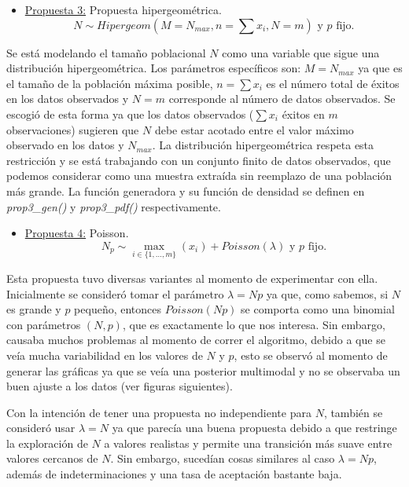 \begin{itemize}
	\item \underline{Propuesta 3:} Propuesta hipergeométrica.
	\begin{equation} \label{eq:12}
		N \sim Hipergeom(M = N_{max}, n = \sum x_{i}, N = m) \text{ y } p \text{ fijo.}
	\end{equation}
\end{itemize}
Se está modelando el tamaño poblacional $N$ como una variable que sigue una distribución hipergeométrica. Los parámetros específicos son: $M = N_{max}$ ya que es el tamaño de la población máxima posible, $n = \sum x_{i}$ es el número total de éxitos en los datos observados y $N = m$ corresponde al número de datos observados. Se escogió de esta forma ya que los datos observados ($\sum x_i$  éxitos en $m$ observaciones) sugieren que $N$ debe estar acotado entre el valor máximo observado en los datos y $N_{max}$. La distribución hipergeométrica respeta esta restricción y se está trabajando con un conjunto finito de datos observados, que podemos considerar como una muestra extraída sin reemplazo de una población más grande. La función generadora y su función de densidad se definen en \textit{prop3\_gen()} y \textit{prop3\_pdf()} respectivamente.

\begin{itemize}
	\item \underline{Propuesta 4:} Poisson.
	\begin{equation} \label{eq:13}
		N_{p} \sim \max _{i \in\{1, \ldots, m\}}\left(x_{i}\right)+ Poisson(\lambda) \text{ y } p \text{ fijo.}
	\end{equation}
\end{itemize}
Esta propuesta tuvo diversas variantes al momento de experimentar con ella. Inicialmente se consideró tomar el parámetro $\lambda=Np$ ya que, como sabemos, si $N$ es grande y $p$ pequeño, entonces $Poisson(Np)$ se comporta como una binomial con parámetros $(N,p)$, que es exactamente lo que nos interesa. Sin embargo, causaba muchos problemas al momento de correr el algoritmo, debido a que se veía mucha variabilidad en los valores de $N$ y $p$, esto se observó al momento de generar las gráficas ya que se veía una posterior multimodal y no se observaba un buen ajuste a los datos (ver figuras siguientes).

Con la intención de tener una propuesta no independiente para $N$, también se consideró usar $\lambda = N$ ya que parecía una buena propuesta debido a que restringe la exploración de $N$ a valores realistas y permite una transición más suave entre valores cercanos de $N$. Sin embargo, sucedían cosas similares al caso $\lambda=Np$, además de indeterminaciones y una tasa de aceptación bastante baja.

